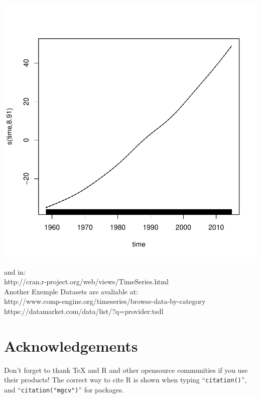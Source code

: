 \documentclass[11pt, a4paper]{article} %
\begin{document}
\begin{Schunk}
\end{Schunk}
\includegraphics{alleselena-079}




and in:\\
http://cran.r-project.org/web/views/TimeSeries.html\\
Another Exemple Datasets are avaliable at:\\
http://www.comp-engine.org/timeseries/browse-data-by-category\\
https://datamarket.com/data/list/?q=provider:tsdl\\
\section{Acknowledgements}%
Don't forget to thank TeX and R and other opensource communities if you use their products! The correct way to cite R is shown when typing ``\texttt{citation()}'', and ``\texttt{citation("mgcv")}'' for packages.

\clearpage
\end{document}
